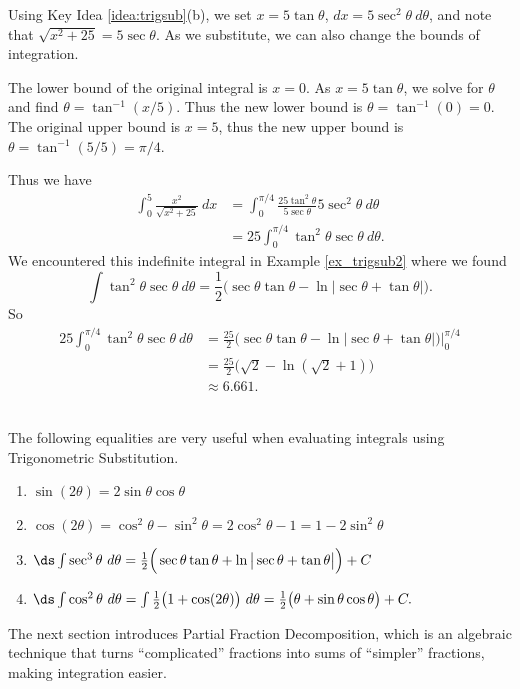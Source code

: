 {Using Key Idea \ref{idea:trigsub}(b), we set $x=5\tan\theta$, $dx = 5\sec^2\theta\ d\theta$, and note that $\sqrt{x^2+25} = 5\sec\theta$. As we substitute, we can also change the bounds of integration.

The lower bound of the original integral is $x=0$. As $x=5\tan\theta$, we solve for $\theta$ and find $\theta = \tan^{-1}(x/5)$. Thus the new lower bound is $\theta = \tan^{-1}(0) = 0$. The original upper bound is $x=5$, thus the new upper bound is $\theta = \tan^{-1}(5/5) = \pi/4$. 

Thus we have 
\begin{align*}
\int_0^5\frac{x^2}{\sqrt{x^2+25}}\ dx &= \int_0^{\pi/4} \frac{25\tan^2\theta}{5\sec\theta}5\sec^2\theta\ d\theta\\
		&= 25\int_0^{\pi/4} \tan^2\theta\sec\theta\ d\theta.
\end{align*}
We encountered this indefinite integral in Example \ref{ex_trigsub2} where we found 
$$\int \tan^2\theta\sec\theta \ d\theta = \frac12\big(\sec\theta\tan\theta-\ln|\sec\theta+\tan\theta|\big).$$
So
\begin{align*}
25\int_0^{\pi/4} \tan^2\theta\sec\theta\ d\theta &= \frac{25}2\big(\sec\theta\tan\theta-\ln|\sec\theta+\tan\theta|\big)\Bigg|_0^{\pi/4}\\
&= \frac{25}2\big(\sqrt2-\ln(\sqrt2+1)\big)\\
&\approx 6.661.
\end{align*}
\baselineskip
}\\

\enlargethispage{3\baselineskip}
The following equalities are very useful when evaluating integrals using Trigonometric Substitution. 

{\begin{enumerate}
	\item	$\sin(2\theta) = 2\sin\theta\cos\theta$
	\item	$\cos(2\theta) = \cos^2\theta - \sin^2\theta = 2\cos^2\theta-1 = 1-2\sin^2\theta$
	\item $\ds \int \sec^3\theta\ d\theta = \frac12\Big(\sec \theta\tan \theta + \ln\big|\sec \theta+\tan \theta\big|\Big)+C$
	\item	$\ds \int \cos^2\theta\ d\theta = \int \frac12\big(1+\cos(2\theta)\big)\ d\theta = \frac12\big(\theta+\sin\theta\cos\theta\big)+C.$
\end{enumerate}
}

The next section introduces Partial Fraction Decomposition, which is an algebraic technique that turns ``complicated'' fractions into sums of ``simpler'' fractions, making integration easier.




